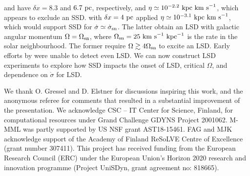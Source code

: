 \documentclass[preprint2]{aastex63}
\newcommand\SNr{\dot\sigma_{\rm sn}}
\newcommand\OSN{\Omega_{\rm sn}}
\newcommand\kpc{~ {\rm kpc}}
\newcommand\pc{~ {\rm pc}}
\newcommand\dx{ {\delta x}}
\newcommand\kms{~ {\rm km~ s}^{-1}}
\newcommand{\fg}[1]{\textcolor{midgreen}{#1}}
\begin{document}
 \citet{Gressel:2008} and \citet{GE20} have $\dx=8.3$ and $6.7\pc$,
 respectively, and $\eta\simeq10^{-2.2}\kpc\kms$, which appears to exclude
 an SSD.
 \citet{Gent:2013a} with $\dx=4\pc$ applied $\eta\simeq10^{-3.1}\kpc\kms$,
 which would support SSD for $\dot\sigma\simeq\SNr$.
 The latter obtain an LSD with galactic angular momentum $\Omega=\OSN$, where
 $\OSN=25\kms\kpc^{-1}$ is the rate in the solar neighbourhood.
 The former require $\Omega\gtrsim4\OSN$ to excite an LSD.
 Early efforts by \citet{Korpi:1999b} were unable to detect even LSD.
 \fg{We can now construct LSD experiments to explore how SSD impacts the 
 onset of LSD, critical $\Omega$, and dependence on $\dot\sigma$ for LSD.}   

\acknowledgments
\fg{We thank O. Gressel \fg{and D. Elstner} for discussions inspiring this work, and the
  anonymous referee for comments that resulted in a substantial
  improvement of the presentation.}
We acknowledge CSC – IT Center for Science, Finland, for
computational resources under Grand Challenge GDYNS Project 2001062.
M-MML was partly supported by US NSF grant AST18-15461.
FAG and MJK acknowledge support of the Academy of Finland
ReSoLVE Centre of Excellence (grant number 307411).
This project has received funding from the European Research Council (ERC)
under the European Union's Horizon 2020 research and innovation
programme (Project UniSDyn, grant agreement no: 818665).
\end{document}
